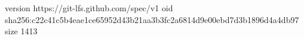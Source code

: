 version https://git-lfs.github.com/spec/v1
oid sha256:c22c41c5b4eae1ce65952d43b21aa3b3fc2a6814d9e00ebd7d3b1896d4a4db97
size 1413
